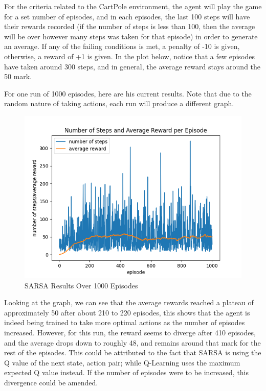 \documentclass[nohyperref]{article}
\theoremstyle{plain}
\theoremstyle{definition}
\theoremstyle{remark}
\begin{document}
For the criteria related to the CartPole environment, the agent will play the game for a set number of episodes, and in each episodes, the last 100 steps will have their rewards recorded (if the number of steps is less than 100, then the average will be over however many steps was taken for that episode) in order to generate an average.
If any of the failing conditions is met, a penalty of -10 is given, otherwise, a reward of +1 is given. In the plot below, notice that a few episodes have taken around 300 steps, and in general, the average reward stays around the 50 mark.

For one run of 1000 episodes, here are his current results. Note that due to the random nature of taking actions, each run will produce a different graph.

\begin{figure}[H] %
    \centering
    \includegraphics[width=1\linewidth]{sarsa-average-1k.png}
    \caption{SARSA Results Over 1000 Episodes}
\end{figure}

Looking at the graph, we can see that the average rewards reached a plateau of approximately 50 after about 210 to 220 episodes, this shows that the agent is indeed being trained to
take more optimal actions as the number of episodes increased. However, for this run, the reward seems to diverge after 410 episodes, and the average drops down to roughly 48, and remains around
that mark for the rest of the episodes. This could be attributed to the fact that SARSA is using the Q value of the next state, action pair; while Q-Learning uses the maximum expected Q value instead.
If the number of episodes were to be increased, this divergence could be amended.
\end{document}
